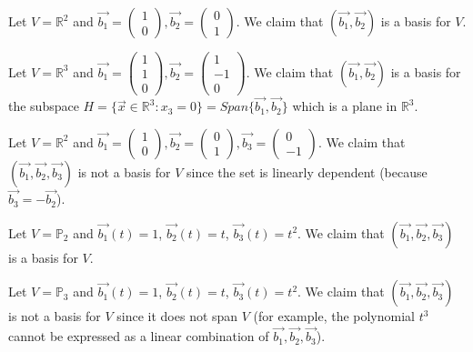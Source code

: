 \begin{eg}
    Let $V = \mathbb{R}^2$ and $\vec{b_1} = \begin{pmatrix} 1 \\ 0 \end{pmatrix}, \vec{b_2} = \begin{pmatrix} 0 \\ 1 \end{pmatrix}$. We claim that $(\vec{b_1}, \vec{b_2})$ is a basis for $V$.
\end{eg}

\begin{eg}
    Let $V = \mathbb{R}^3$ and $\vec{b_1} = \begin{pmatrix}
        1 \\ 1 \\ 0
    \end{pmatrix}, \vec{b_2} = \begin{pmatrix}
        1 \\ -1 \\ 0
    \end{pmatrix}$. We claim that $(\vec{b_1}, \vec{b_2})$ is a basis for the subspace $H = \{\vec{x} \in \mathbb{R}^3 : x_3 = 0\} = Span\{\vec{b_1}, \vec{b_2}\}$ which is a plane in $\mathbb{R}^3$.
\end{eg}

\begin{eg}
    Let $V = \mathbb{R}^2$ and $\vec{b_1} = \begin{pmatrix}
        1 \\ 0
    \end{pmatrix}, \vec{b_2} = \begin{pmatrix}
        0 \\ 1
    \end{pmatrix}, \vec{b_3} = \begin{pmatrix}
        0 \\ -1
    \end{pmatrix}$. We claim that $(\vec{b_1}, \vec{b_2}, \vec{b_3})$ is not a basis for $V$ since the set is linearly dependent (because $\vec{b_3} = -\vec{b_2}$).
\end{eg}

\begin{eg}
    Let $V = \mathbb{P}_2$ and $\vec{b_1}(t) = 1$, $\vec{b_2}(t) = t$, $\vec{b_3}(t) = t^2$. We claim that $(\vec{b_1}, \vec{b_2}, \vec{b_3})$ is a basis for $V$.
\end{eg}

\begin{eg}
    Let $V = \mathbb{P}_3$ and $\vec{b_1}(t) = 1$, $\vec{b_2}(t) = t$, $\vec{b_3}(t) = t^2$. We claim that $(\vec{b_1}, \vec{b_2}, \vec{b_3})$ is not a basis for $V$ since it does not span $V$ (for example, the polynomial $t^3$ cannot be expressed as a linear combination of $\vec{b_1}, \vec{b_2}, \vec{b_3}$).
\end{eg}

